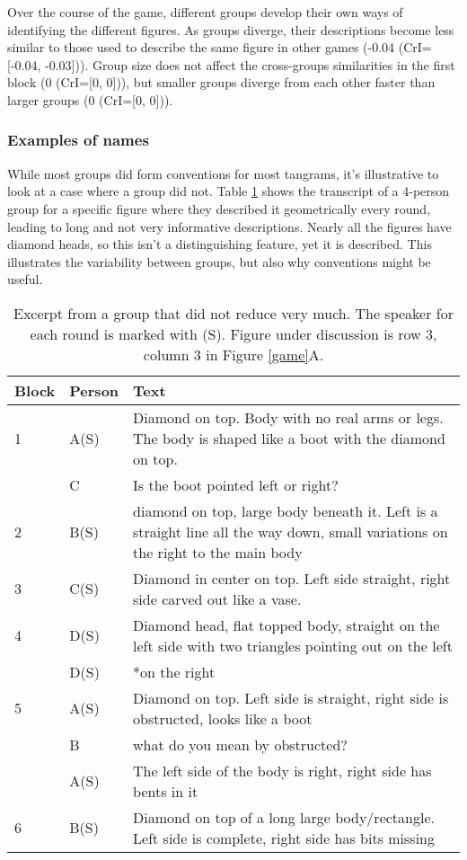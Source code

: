 \documentclass[
  english,
  a4paper,
]{article}
\begin{document}
Over the course of the game, different groups develop their own ways of identifying the different figures. As groups diverge, their descriptions become less similar to those used to describe the same figure in other games (-0.04 (CrI={[}-0.04, -0.03{]})). Group size does not affect the cross-groups similarities in the first block (0 (CrI={[}0, 0{]})), but smaller groups diverge from each other faster than larger groups (0 (CrI={[}0, 0{]})).

\hypertarget{examples-of-names}{%
\subsubsection{Examples of names}\label{examples-of-names}}

While most groups did form conventions for most tangrams, it's illustrative to look at a case where a group did not. Table \ref{diamond} shows the transcript of a 4-person group for a specific figure where they described it geometrically every round, leading to long and not very informative descriptions. Nearly all the figures have diamond heads, so this isn't a distinguishing feature, yet it is described. This illustrates the variability between groups, but also why conventions might be useful.

\begin{table}[H]

\caption{\label{tab:diamond}Excerpt from a group that did not reduce very much. The speaker for each round is marked with (S). Figure under discussion is row 3, column 3 in Figure \ref{game}A.\label{diamond}}
\centering
\begin{tabular}[t]{ll>{\raggedright\arraybackslash}p{16em}}
\toprule
Block & Person & Text\\
\midrule
1 & A(S) & Diamond on top. Body with no real arms or legs. The body is shaped like a boot with the diamond on top.\\
 & C & Is the boot pointed left or right?\\
2 & B(S) & diamond on top, large body beneath it. Left is a straight line all the way down, small variations on the right to the main body\\
3 & C(S) & Diamond in center on top. Left side straight, right side carved out like a vase.\\
4 & D(S) & Diamond head, flat topped body, straight on the left side with two triangles pointing out on the left\\
 & D(S) & *on the right\\
5 & A(S) & Diamond on top. Left side is straight, right side is obstructed, looks like a boot\\
 & B & what do you mean by obstructed?\\
 & A(S) & The left side of the body is right, right side has bents in it\\
6 & B(S) & Diamond on top of a long large body/rectangle. Left side is complete, right side has bits missing\\
\bottomrule
\end{tabular}
\end{table}
\end{document}
